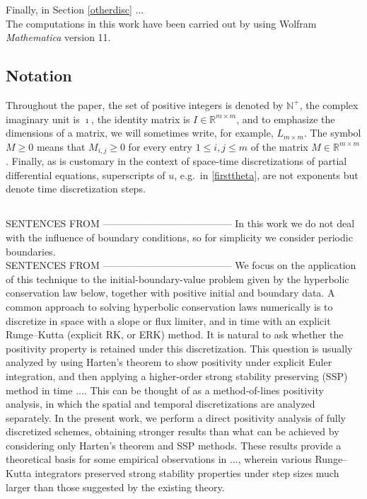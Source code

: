 \documentclass[a4paper]{article}
\newcommand{\nplus}{\mathbb{N}^+}
\newcommand{\rr}{\mathbb{R}}
\begin{document}
Finally, in Section \ref{otherdisc} ...\\

The computations in this work have been carried out by using Wolfram \textit{Mathematica} version 11.


\subsection{Notation}
Throughout the paper, the set of positive integers is denoted by $\nplus$, the complex imaginary unit is $\imath$, the identity matrix is $I\in\rr^{m\times m}$, and to emphasize the dimensions of a matrix, we will sometimes write, for example, $L_{m\times m}$.
The symbol $M\ge 0$ means that  $M_{i,j}\ge 0$ for every entry $1\le i, j\le m$ of the matrix $M\in\mathbb{R}^{m\times m}$. Finally, as is customary in the context of space-time discretizations of partial differential equations, superscripts of $u$, e.g.~in \eqref{firsttheta}, are not exponents but denote time discretization steps.  







\subsection{}
SENTENCES FROM \cite{posconv}---------------------------------------
In this work we do not deal with the influence of boundary conditions, so for simplicity
we consider periodic boundaries.\\
SENTENCES FROM \cite{posconv}---------------------------------------
We focus on the application of this technique to the initial-boundary-value problem given
by the hyperbolic conservation law below, together with positive initial and boundary data.
A common approach to solving hyperbolic conservation laws numerically is to discretize in
space with a slope or flux limiter, and in time with an explicit Runge--Kutta (explicit RK,
or ERK) method. It is natural to ask whether the positivity property is retained under this
discretization. This question is usually analyzed by using Harten's theorem
to show positivity under explicit Euler integration, and then applying a higher-order strong
stability preserving (SSP) method in time .... This can be thought of as a method-of-lines
positivity analysis, in which the spatial and temporal discretizations are analyzed separately.
In the present work, we perform a direct positivity analysis of fully discretized schemes,
obtaining stronger results than what can be achieved by considering only Harten's theorem
and SSP methods. These results provide a theoretical basis for some empirical observations in
..., wherein various Runge--Kutta integrators preserved strong stability properties under
step sizes much larger than those suggested by the existing theory.
\end{document}
